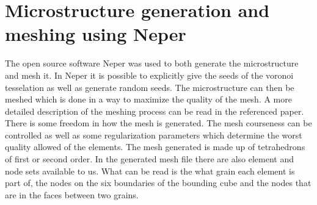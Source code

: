 \documentclass[micro_gen.tex]{subfiles}
\begin{document}
\chapter{Microstructure generation and meshing using Neper}

The open source software Neper \cite{neper} was used to both generate the microstructure and mesh it. In Neper it is possible to explicitly give the seeds of the voronoi tesselation as well as generate random seeds. The microstructure can then be meshed which is done in a way to maximize the quality of the mesh. A more detailed description of the meshing process can be read in the referenced paper. There is some freedom in how the mesh is generated. The mesh courseness can be controlled as well as some regularization parameters which determine the worst quality allowed of the elements. The mesh generated is made up of tetrahedrons of first or second order. In the generated mesh file there are also element and node sets available to us. What can be read is the what grain each element is part of, the nodes on the six boundaries of the bounding cube and the nodes that are in the faces between two grains.
\end{document}
